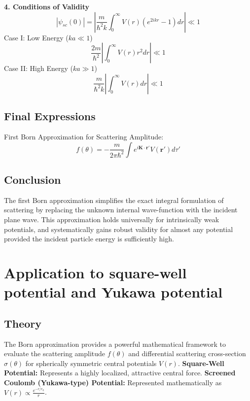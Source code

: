 \documentclass[12pt]{report}
\begin{document}
\textbf{4. Conditions of Validity}
\begin{equation}
|\psi_{sc}(0)| = \left| \frac{m}{\hbar^2 k} \int_0^\infty V(r) (e^{2ikr} - 1) dr \right| \ll 1
\end{equation}
Case I: Low Energy ($ka \ll 1$)
\begin{equation}
\frac{2m}{\hbar^2} \left| \int_0^\infty V(r) r^2 dr \right| \ll 1
\end{equation}
Case II: High Energy ($ka \gg 1$)
\begin{equation}
\frac{m}{\hbar^2 k} \left| \int_0^\infty V(r) dr \right| \ll 1
\end{equation}

\subsection*{Final Expressions}
First Born Approximation for Scattering Amplitude:
\begin{equation}
\boxed{ f(\theta) = -\frac{m}{2\pi\hbar^2} \int e^{i\mathbf{K}\cdot\mathbf{r}'} V(\mathbf{r}') d\tau' }
\end{equation}

\subsection*{Conclusion}
The first Born approximation simplifies the exact integral formulation of scattering by replacing the unknown internal wave-function with the incident plane wave. This approximation holds universally for intrinsically weak potentials, and systematically gains robust validity for almost any potential provided the incident particle energy is sufficiently high.


\section{Application to square-well potential and Yukawa potential}



\subsection*{Theory}
The Born approximation provides a powerful mathematical framework to evaluate the scattering amplitude $f(\theta)$ and differential scattering cross-section $\sigma(\theta)$ for spherically symmetric central potentials $V(r)$.
\textbf{Square-Well Potential:} Represents a highly localized, attractive central force.
\textbf{Screened Coulomb (Yukawa-type) Potential:} Represented mathematically as $V(r) \propto \frac{e^{-r/r_0}}{r}$.
\end{document}
